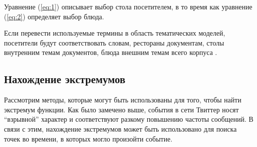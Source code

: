 \documentclass[14pt,a4paper,oneside]{extarticle}
\begin{document}
  Уравнение (\ref{eq:1}) описывает выбор стола посетителем, в то время как уравнение (\ref{eq:2}) определяет выбор блюда.
  
  Если перевести используемые термины в область тематических моделей, посетители будут соответствовать словам, рестораны документам, столы внутренним темам документов, блюда внешним темам всего корпуса \cite{hdp-1}.
  
	\subsection{Нахождение экстремумов}
	\label{maxima-detection-subsection}
	Рассмотрим методы, которые могут быть использованы для того, чтобы найти экстремум функции. Как было замечено выше, события в сети Твиттер носят ``взрывной'' характер и соответствуют разкому повышению частоты сообщений. В связи с этим, нахождение экстремумов может быть использовано для поиска точек во времени, в которых могло произойти событие.
	
\end{document}
